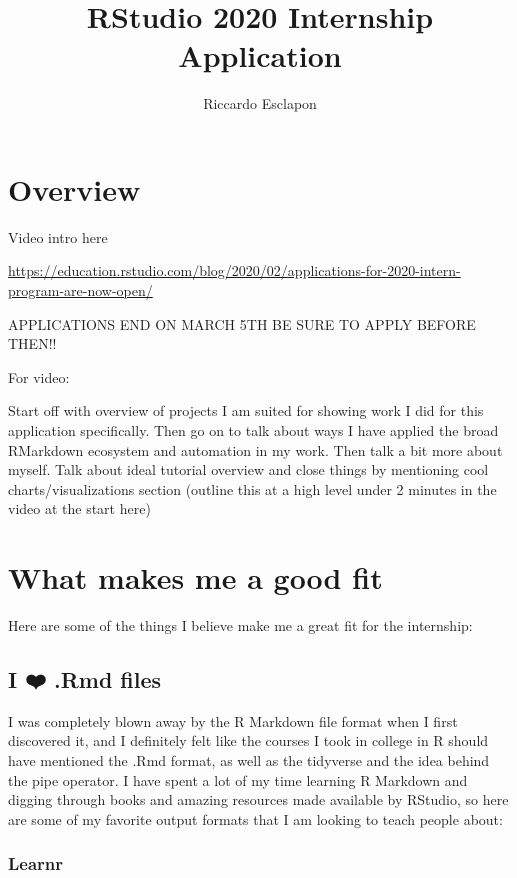 \documentclass[
]{book}
\title{RStudio 2020 Internship Application}
\author{Riccardo Esclapon}
\date{}
\begin{document}
\maketitle

{
\setcounter{tocdepth}{1}
\tableofcontents
}
\hypertarget{overview}{%
\chapter{Overview}\label{overview}}

Video intro here

\url{https://education.rstudio.com/blog/2020/02/applications-for-2020-intern-program-are-now-open/}

APPLICATIONS END ON MARCH 5TH BE SURE TO APPLY BEFORE THEN!!

For video:

Start off with overview of projects I am suited for showing work I did for this application specifically. Then go on to talk about ways I have applied the broad RMarkdown ecosystem and automation in my work. Then talk a bit more about myself. Talk about ideal tutorial overview and close things by mentioning cool charts/visualizations section (outline this at a high level under 2 minutes in the video at the start here)

\hypertarget{fit}{%
\chapter{What makes me a good fit}\label{fit}}

Here are some of the things I believe make me a great fit for the internship:

\hypertarget{i-uxfe0f-.rmd-files}{%
\section{I ❤️ .Rmd files}\label{i-uxfe0f-.rmd-files}}

I was completely blown away by the R Markdown file format when I first discovered it, and I definitely felt like the courses I took in college in R should have mentioned the .Rmd format, as well as the tidyverse and the idea behind the pipe operator. I have spent a lot of my time learning R Markdown and digging through books and amazing resources made available by RStudio, so here are some of my favorite output formats that I am looking to teach people about:

\hypertarget{learnr}{%
\subsection{Learnr}\label{learnr}}
\end{document}
